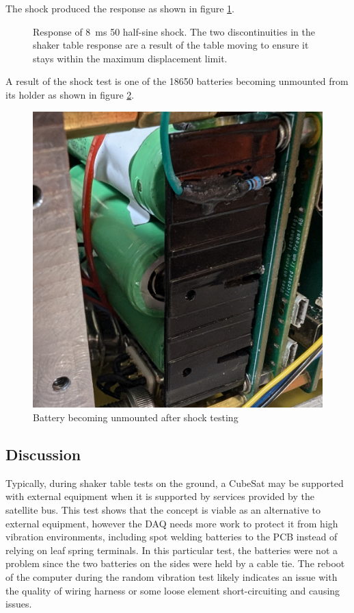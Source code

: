 \documentclass{report}
\begin{document}
The shock produced the response as shown in figure \ref{fig:shock-table-resp}.

\begin{figure}[H]
  \centering
  
  \caption{Response of \SI{8}{\milli\second} \SI{50}{\gacc} half-sine shock. The two discontinuities in the shaker table response are a result of the table moving to ensure it stays within the maximum displacement limit.}
  \label{fig:shock-table-resp}
\end{figure}

A result of the shock test is one of the 18650 batteries becoming unmounted from its holder as shown in figure \ref{fig:dislodged-battery}.

\begin{figure}[H]
  \centering
  \includegraphics[width=0.7\linewidth]{images/dislodged_battery.jpg}
  \caption{Battery becoming unmounted after shock testing}
  \label{fig:dislodged-battery}
\end{figure}

\subsection{Discussion}

Typically, during shaker table tests on the ground, a CubeSat may be supported with external equipment when it is supported by services provided by the satellite bus. This test shows that the concept is viable as an alternative to external equipment, however the DAQ needs more work to protect it from high vibration environments, including spot welding batteries to the PCB instead of relying on leaf spring terminals. In this particular test, the batteries were not a problem since the two batteries on the sides were held by a cable tie. The reboot of the computer during the random vibration test likely indicates an issue with the quality of wiring harness or some loose element short-circuiting and causing issues.
\end{document}
